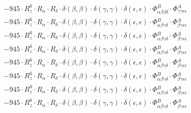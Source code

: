 \documentclass{article}
\begin{document}
\begin{subequations}
\begin{gather}
\begin{array}{c}
 \\[0.2em] 		 - 945 \cdot R_{z}^{6} \cdot R_{\alpha{}} \cdot R_{\delta{}} \cdot \delta{}\left(\beta{}, \beta{}\right) \cdot \delta{}\left(\gamma{}, \gamma{}\right) \cdot \delta{}\left(\epsilon{}, \epsilon{}\right) \cdot \Phi{}^{B}_{\alpha{}\beta{}\beta{}\delta{}} \cdot \Phi{}^{A}_{\gamma{}\gamma{}\epsilon{}\epsilon{}} 
 \\[0.2em] 		 - 945 \cdot R_{z}^{6} \cdot R_{\alpha{}} \cdot R_{\delta{}} \cdot \delta{}\left(\beta{}, \beta{}\right) \cdot \delta{}\left(\gamma{}, \gamma{}\right) \cdot \delta{}\left(\epsilon{}, \epsilon{}\right) \cdot \Phi{}^{B}_{\alpha{}\beta{}\gamma{}\delta{}} \cdot \Phi{}^{A}_{\beta{}\gamma{}\epsilon{}\epsilon{}} 
 \\[0.2em] 		 - 945 \cdot R_{z}^{6} \cdot R_{\alpha{}} \cdot R_{\delta{}} \cdot \delta{}\left(\beta{}, \beta{}\right) \cdot \delta{}\left(\gamma{}, \gamma{}\right) \cdot \delta{}\left(\epsilon{}, \epsilon{}\right) \cdot \Phi{}^{B}_{\alpha{}\beta{}\gamma{}\delta{}} \cdot \Phi{}^{A}_{\beta{}\gamma{}\epsilon{}\epsilon{}} 
 \\[0.2em] 		 - 945 \cdot R_{z}^{6} \cdot R_{\alpha{}} \cdot R_{\delta{}} \cdot \delta{}\left(\beta{}, \beta{}\right) \cdot \delta{}\left(\gamma{}, \gamma{}\right) \cdot \delta{}\left(\epsilon{}, \epsilon{}\right) \cdot \Phi{}^{B}_{\alpha{}\beta{}\gamma{}\delta{}} \cdot \Phi{}^{A}_{\beta{}\gamma{}\epsilon{}\epsilon{}} 
 \\[0.2em] 		 - 945 \cdot R_{z}^{6} \cdot R_{\alpha{}} \cdot R_{\delta{}} \cdot \delta{}\left(\beta{}, \beta{}\right) \cdot \delta{}\left(\gamma{}, \gamma{}\right) \cdot \delta{}\left(\epsilon{}, \epsilon{}\right) \cdot \Phi{}^{B}_{\alpha{}\beta{}\gamma{}\delta{}} \cdot \Phi{}^{A}_{\beta{}\gamma{}\epsilon{}\epsilon{}} 
 \\[0.2em] 		 - 945 \cdot R_{z}^{6} \cdot R_{\alpha{}} \cdot R_{\delta{}} \cdot \delta{}\left(\beta{}, \beta{}\right) \cdot \delta{}\left(\gamma{}, \gamma{}\right) \cdot \delta{}\left(\epsilon{}, \epsilon{}\right) \cdot \Phi{}^{B}_{\alpha{}\beta{}\gamma{}\delta{}} \cdot \Phi{}^{A}_{\beta{}\gamma{}\epsilon{}\epsilon{}} 
 \\[0.2em] 		 - 945 \cdot R_{z}^{6} \cdot R_{\alpha{}} \cdot R_{\delta{}} \cdot \delta{}\left(\beta{}, \beta{}\right) \cdot \delta{}\left(\gamma{}, \gamma{}\right) \cdot \delta{}\left(\epsilon{}, \epsilon{}\right) \cdot \Phi{}^{B}_{\alpha{}\beta{}\gamma{}\delta{}} \cdot \Phi{}^{A}_{\beta{}\gamma{}\epsilon{}\epsilon{}} 
 \\[0.2em] 		 - 945 \cdot R_{z}^{6} \cdot R_{\alpha{}} \cdot R_{\delta{}} \cdot \delta{}\left(\beta{}, \beta{}\right) \cdot \delta{}\left(\gamma{}, \gamma{}\right) \cdot \delta{}\left(\epsilon{}, \epsilon{}\right) \cdot \Phi{}^{B}_{\alpha{}\beta{}\gamma{}\delta{}} \cdot \Phi{}^{A}_{\beta{}\gamma{}\epsilon{}\epsilon{}} 

\end{array}
\end{gather}
\end{subequations}
\end{document}
